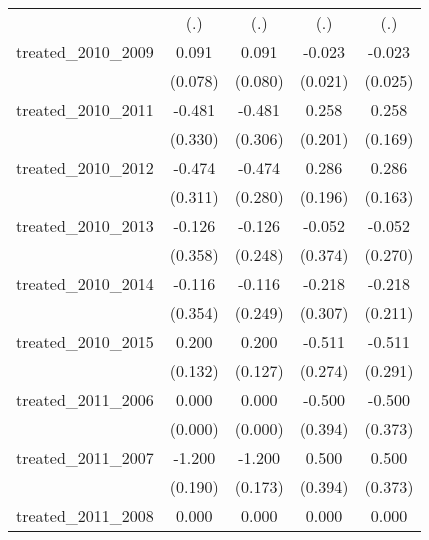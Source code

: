 {\begin{tabular}{l*{4}{c}}
            &         (.)         &         (.)         &         (.)         &         (.)         \\
[1em]
treated\_2010\_2009&       0.091         &       0.091         &      -0.023         &      -0.023         \\
            &     (0.078)         &     (0.080)         &     (0.021)         &     (0.025)         \\
[1em]
treated\_2010\_2011&      -0.481         &      -0.481         &       0.258         &       0.258         \\
            &     (0.330)         &     (0.306)         &     (0.201)         &     (0.169)         \\
[1em]
treated\_2010\_2012&      -0.474         &      -0.474         &       0.286         &       0.286         \\
            &     (0.311)         &     (0.280)         &     (0.196)         &     (0.163)         \\
[1em]
treated\_2010\_2013&      -0.126         &      -0.126         &      -0.052         &      -0.052         \\
            &     (0.358)         &     (0.248)         &     (0.374)         &     (0.270)         \\
[1em]
treated\_2010\_2014&      -0.116         &      -0.116         &      -0.218         &      -0.218         \\
            &     (0.354)         &     (0.249)         &     (0.307)         &     (0.211)         \\
[1em]
treated\_2010\_2015&       0.200         &       0.200         &      -0.511         &      -0.511         \\
            &     (0.132)         &     (0.127)         &     (0.274)         &     (0.291)         \\
[1em]
treated\_2011\_2006&       0.000         &       0.000         &      -0.500         &      -0.500         \\
            &     (0.000)         &     (0.000)         &     (0.394)         &     (0.373)         \\
[1em]
treated\_2011\_2007&      -1.200\sym{***}&      -1.200\sym{***}&       0.500         &       0.500         \\
            &     (0.190)         &     (0.173)         &     (0.394)         &     (0.373)         \\
[1em]
treated\_2011\_2008&       0.000         &       0.000         &       0.000         &       0.000         \\

\end{tabular}}
